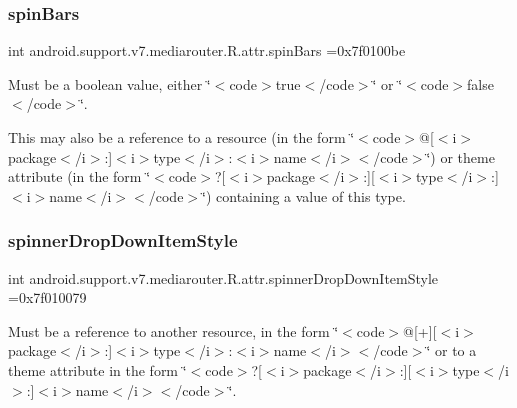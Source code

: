 \subsubsection{\texorpdfstring{spin\+Bars}{spinBars}}
{\footnotesize\ttfamily int android.\+support.\+v7.\+mediarouter.\+R.\+attr.\+spin\+Bars =0x7f0100be\hspace{0.3cm}{\ttfamily [static]}}

Must be a boolean value, either \char`\"{}$<$code$>$true$<$/code$>$\char`\"{} or \char`\"{}$<$code$>$false$<$/code$>$\char`\"{}. 

This may also be a reference to a resource (in the form \char`\"{}$<$code$>$@\mbox{[}$<$i$>$package$<$/i$>$\+:\mbox{]}$<$i$>$type$<$/i$>$\+:$<$i$>$name$<$/i$>$$<$/code$>$\char`\"{}) or theme attribute (in the form \char`\"{}$<$code$>$?\mbox{[}$<$i$>$package$<$/i$>$\+:\mbox{]}\mbox{[}$<$i$>$type$<$/i$>$\+:\mbox{]}$<$i$>$name$<$/i$>$$<$/code$>$\char`\"{}) containing a value of this type. \mbox{\label{classandroid_1_1support_1_1v7_1_1mediarouter_1_1R_1_1attr_a9d74d670aa6baf3da1cbd7cf6b112023}} 
\subsubsection{\texorpdfstring{spinner\+Drop\+Down\+Item\+Style}{spinnerDropDownItemStyle}}
{\footnotesize\ttfamily int android.\+support.\+v7.\+mediarouter.\+R.\+attr.\+spinner\+Drop\+Down\+Item\+Style =0x7f010079\hspace{0.3cm}{\ttfamily [static]}}

Must be a reference to another resource, in the form \char`\"{}$<$code$>$@\mbox{[}+\mbox{]}\mbox{[}$<$i$>$package$<$/i$>$\+:\mbox{]}$<$i$>$type$<$/i$>$\+:$<$i$>$name$<$/i$>$$<$/code$>$\char`\"{} or to a theme attribute in the form \char`\"{}$<$code$>$?\mbox{[}$<$i$>$package$<$/i$>$\+:\mbox{]}\mbox{[}$<$i$>$type$<$/i$>$\+:\mbox{]}$<$i$>$name$<$/i$>$$<$/code$>$\char`\"{}. \mbox{\label{classandroid_1_1support_1_1v7_1_1mediarouter_1_1R_1_1attr_a6bbcb4b4bdf41ad15231f9ec5bb86d9c}} 
